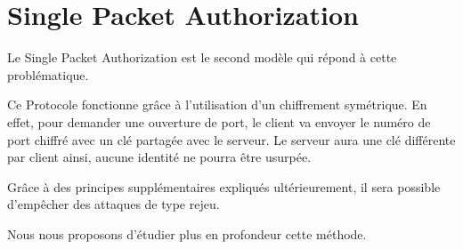 \chapter{Single Packet Authorization}

Le Single Packet Authorization est le second modèle qui répond à cette problématique.

Ce Protocole fonctionne grâce à l'utilisation d'un chiffrement symétrique. En effet, pour demander une ouverture de port, le client va envoyer le numéro de port chiffré avec un clé partagée avec le serveur. Le serveur aura une clé différente par client ainsi, aucune identité ne pourra être usurpée.

Grâce à des principes supplémentaires expliqués ultérieurement, il sera possible d'empêcher des attaques de type rejeu.

Nous nous proposons d'étudier plus en profondeur cette méthode.

